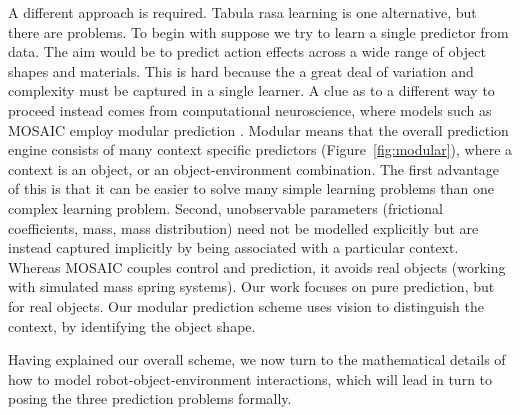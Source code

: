 A different approach is required. Tabula rasa learning is one alternative, but there are problems.  To begin with suppose we try to learn a single predictor from data. The aim would be to predict action effects across a wide range of object shapes and materials. This is hard because the a great deal of variation and complexity must be captured in a single learner. A clue as to a different way to proceed instead comes from computational neuroscience, where models such as MOSAIC employ modular prediction \citep{Haruno_MOSAIC_2008}. Modular means that the overall prediction engine consists of many context specific predictors (Figure~\ref{fig:modular}), where a context is an object, or an object-environment combination. The first advantage of this is that it can be easier to solve many simple learning problems than one complex learning problem. Second, unobservable parameters (frictional coefficients, mass, mass distribution) need not be modelled explicitly but are instead captured implicitly by being associated with a particular context. Whereas MOSAIC couples control and prediction, it avoids real objects (working with simulated mass spring systems). Our work focuses on pure prediction, but for real objects. Our modular prediction scheme uses vision to distinguish the context, by identifying the object shape.

Having explained our overall scheme, we now turn to the mathematical details of how to model robot-object-environment interactions, which will lead in turn to posing the three prediction problems formally.
